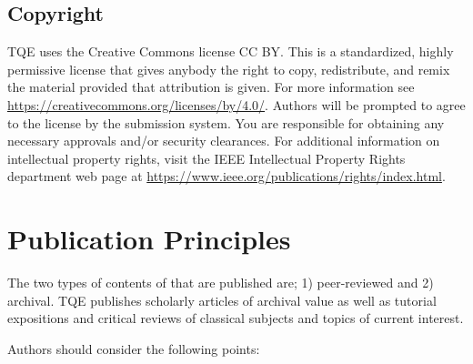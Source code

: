 \documentclass{ieeeaccess}
\begin{document}
\subsection{Copyright}
TQE uses the Creative Commons license CC BY. This is a standardized, highly permissive
license that gives anybody the right to copy, redistribute, and remix the material
provided that attribution is given. For more information see
\underline{https://creativecommons.org/licenses/by/4.0/}.
Authors will be prompted to agree to the
license by the submission system. You are responsible for obtaining any necessary
approvals and/or security clearances. For additional information on intellectual
property rights, visit the IEEE Intellectual Property Rights department web page at
\underline{https://www.ieee.org/publications/rights/index.html}.


\section{Publication Principles}
The two types of contents of that are published are; 1) peer-reviewed and 2)
archival. TQE publishes scholarly
articles of archival value as well as tutorial expositions and critical
reviews of classical subjects and topics of current interest.

Authors should consider the following points:
\end{document}
